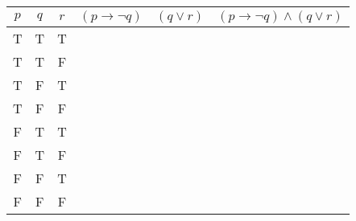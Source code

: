 \documentclass{article}
\begin{document}
\begin{table}[]
  \centering
  \begin{tabular}{|c|c|c||c|c|c|}
    \hline
    $p$ & $q$ & $r$ & $(p \rightarrow \neg q)$ & $(q \vee r)$ & $(p \rightarrow \neg q) \wedge (q \vee r)$ \\ \hline
    T   & T   & T   &                          &              &                                            \\ \hline
    T   & T   & F   &                          &              &                                            \\ \hline
    T   & F   & T   &                          &              &                                            \\ \hline
    T   & F   & F   &                          &              &                                            \\ \hline
    F   & T   & T   &                          &              &                                            \\ \hline
    F   & T   & F   &                          &              &                                            \\ \hline
    F   & F   & T   &                          &              &                                            \\ \hline
    F   & F   & F   &                          &              &                                            \\ \hline
  \end{tabular}
\end{table}
\end{document}

